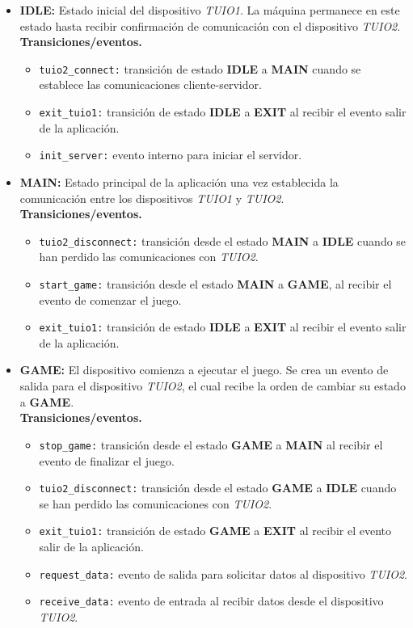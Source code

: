 \begin{itemize}
\item \textbf{IDLE:} Estado inicial del dispositivo \emph{TUIO1}. La máquina permanece en este estado hasta recibir confirmación de comunicación con el dispositivo \emph{TUIO2}.\\
\textbf{Transiciones/eventos.}
\begin{itemize}
\item \texttt{tuio2\_connect:} transición de estado \textbf{IDLE} a \textbf{MAIN} cuando se establece las comunicaciones cliente-servidor.
\item \texttt{exit\_tuio1:} transición de estado \textbf{IDLE} a \textbf{EXIT} al recibir el evento salir de la aplicación.
\item \texttt{init\_server:} evento interno para iniciar el servidor.
\end{itemize}


\item \textbf{MAIN:} Estado principal de la aplicación una vez establecida la comunicación entre los dispositivos \emph{TUIO1} y \emph{TUIO2}.\\
\textbf{Transiciones/eventos.}
\begin{itemize}
\item \texttt{tuio2\_disconnect:} transición desde el estado \textbf{MAIN} a \textbf{IDLE} cuando se han perdido las comunicaciones con \emph{TUIO2}.
\item \texttt{start\_game:} transición desde el estado \textbf{MAIN} a \textbf{GAME}, al recibir el evento de comenzar el juego.
\item \texttt{exit\_tuio1:} transición de estado \textbf{IDLE} a \textbf{EXIT} al recibir el evento salir de la aplicación.
\end{itemize}


\item \textbf{GAME:} El dispositivo comienza a ejecutar el juego. Se crea un evento de salida para el dispositivo \emph{TUIO2}, el cual recibe la orden de cambiar su estado a \textbf{GAME}.\\
\textbf{Transiciones/eventos.}
\begin{itemize}
\item \texttt{stop\_game:} transición desde el estado \textbf{GAME} a \textbf{MAIN} al recibir el evento de finalizar el juego.
\item \texttt{tuio2\_disconnect:} transición desde el estado \textbf{GAME} a \textbf{IDLE} cuando se han perdido las comunicaciones con \emph{TUIO2}.
\item \texttt{exit\_tuio1:} transición de estado \textbf{GAME} a \textbf{EXIT} al recibir el evento salir de la aplicación.
\item \texttt{request\_data:} evento de salida para solicitar datos al dispositivo \emph{TUIO2}.
\item \texttt{receive\_data:} evento de entrada al recibir datos desde el dispositivo \emph{TUIO2}.
\end{itemize}



\end{itemize}
